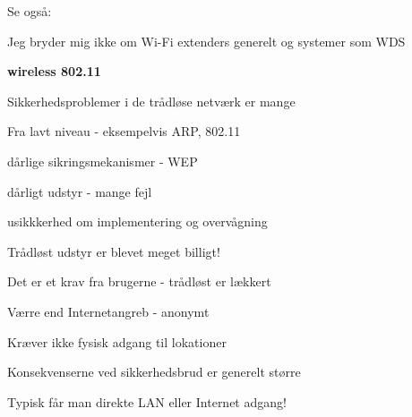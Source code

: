\documentclass[Screen16to9,17pt]{foils}
\begin{document}


\begin{list1}
\item Se også:
\item Jeg bryder mig ikke om Wi-Fi extenders generelt og systemer som WDS
\end{list1}








\centerline{\color{titlecolor}\LARGE\bf wireless 802.11}

\begin{list1}
\item Sikkerhedsproblemer i de trådløse netværk er mange
  \begin{list2}
  \item Fra lavt niveau - eksempelvis ARP, 802.11
  \item dårlige sikringsmekanismer - WEP
  \item dårligt udstyr - mange fejl
  \item usikkkerhed om implementering og overvågning
  \end{list2}
\item Trådløst udstyr er blevet meget billigt!
\item Det er et krav fra brugerne - trådløst er lækkert
\end{list1}




\begin{list2}
\item Værre end Internetangreb - anonymt
\item Kræver ikke fysisk adgang til lokationer
\item Konsekvenserne ved sikkerhedsbrud er generelt større
\item Typisk får man direkte LAN eller Internet adgang!
\end{list2}


\end{document}
